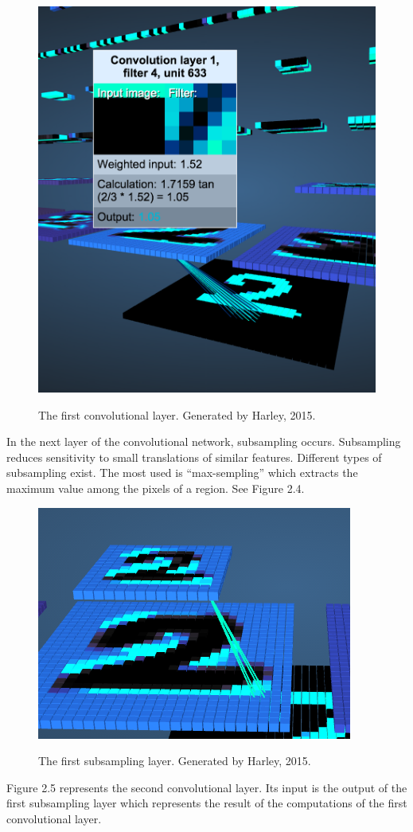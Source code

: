 \begin{figure}[!ht]
  \centering
  \includegraphics[scale=0.6]{figures/conv2.png}  
  \caption[The first convolutional layer. Generated by Harley, 2015.]{The first convolutional layer. Generated by Harley, 2015.}
  \protect\label{fig:conv2}
\end{figure}
\FloatBarrier
In the next layer of the convolutional network, subsampling occurs. Subsampling reduces sensitivity to small translations of similar features. Different types of subsampling exist. The most used is \enquote{max-sempling} which extracts the maximum value among the pixels of a region. See Figure 2.4. 

\begin{figure}[!ht]
  \centering
  \includegraphics[scale=1.0]{figures/conv3.png}  
  \caption[The first subsampling layer. Generated by Harley, 2015.]{The first subsampling layer. Generated by Harley, 2015.}
  \protect\label{fig:conv3}
\end{figure}
\FloatBarrier
Figure 2.5 represents the second convolutional layer. Its input is the output of the first subsampling layer which represents the result of the computations of the first convolutional layer.

